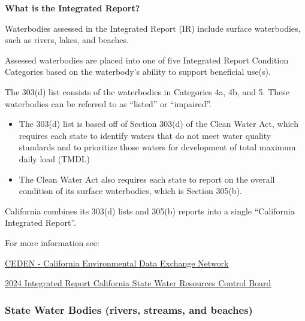 \documentclass[
  letterpaper,
  DIV=11,
  numbers=noendperiod]{scrreprt}
\begin{document}
\begin{tcolorbox}[enhanced jigsaw, breakable, title=\textcolor{quarto-callout-important-color}{\faExclamation}\hspace{0.5em}{Important}, coltitle=black, colframe=quarto-callout-important-color-frame, opacitybacktitle=0.6, colback=white, opacityback=0, bottomrule=.15mm, colbacktitle=quarto-callout-important-color!10!white, leftrule=.75mm, bottomtitle=1mm, toptitle=1mm, toprule=.15mm, left=2mm, titlerule=0mm, arc=.35mm, rightrule=.15mm]

\textbf{What is the Integrated Report?}

Waterbodies assessed in the Integrated Report (IR) include surface
waterbodies, such as rivers, lakes, and beaches.

Assessed waterbodies are placed into one of five Integrated Report
Condition Categories based on the waterbody's ability to support
beneficial use(s).

The 303(d) list consists of the waterbodies in Categories 4a, 4b, and 5.
These waterbodies can be referred to as ``listed'' or ``impaired''.

\begin{itemize}
\item
  The 303(d) list is based off of Section 303(d) of the Clean Water Act,
  which requires each state to identify waters that do not meet water
  quality standards and to prioritize those waters for development of
  total maximum daily load (TMDL)
\item
  The Clean Water Act also requires each state to report on the overall
  condition of its surface waterbodies, which is Section 305(b).
\end{itemize}

California combines its 303(d) lists and 305(b) reports into a single
``California Integrated Report''.

For more information see:

\href{https://ceden.org/303d_list.shtml}{CEDEN - California
Environmental Data Exchange Network}

\href{https://www.waterboards.ca.gov/water_issues/programs/water_quality_assessment/2024-integrated-report.html}{2024
Integrated Report \textbar{} California State Water Resources Control
Board}

\end{tcolorbox}

\subsubsection{State Water Bodies (rivers, streams, and
beaches)}\label{state-water-bodies-rivers-streams-and-beaches}
\end{document}
